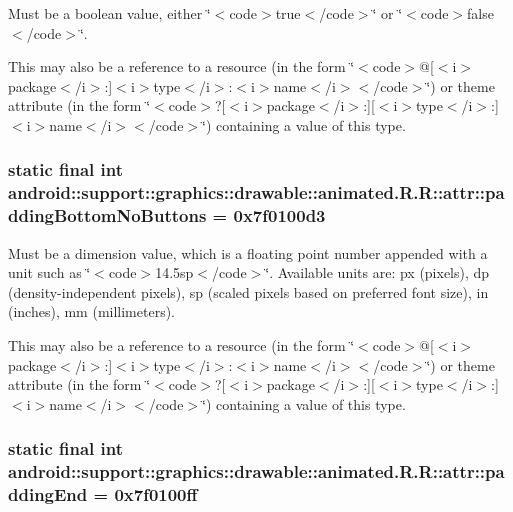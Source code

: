 Must be a boolean value, either \char`\"{}$<$code$>$true$<$/code$>$\char`\"{} or \char`\"{}$<$code$>$false$<$/code$>$\char`\"{}. 

This may also be a reference to a resource (in the form \char`\"{}$<$code$>$@\mbox{[}$<$i$>$package$<$/i$>$:\mbox{]}$<$i$>$type$<$/i$>$:$<$i$>$name$<$/i$>$$<$/code$>$\char`\"{}) or theme attribute (in the form \char`\"{}$<$code$>$?\mbox{[}$<$i$>$package$<$/i$>$:\mbox{]}\mbox{[}$<$i$>$type$<$/i$>$:\mbox{]}$<$i$>$name$<$/i$>$$<$/code$>$\char`\"{}) containing a value of this type. \hypertarget{classandroid_1_1support_1_1graphics_1_1drawable_1_1animated_1_1_r_1_1attr_d042d319f3a81977dd3126ed6f17b016}{
\subsubsection[{paddingBottomNoButtons}]{\setlength{\rightskip}{0pt plus 5cm}static final int android::support::graphics::drawable::animated.R.R::attr::paddingBottomNoButtons = 0x7f0100d3}}
\label{classandroid_1_1support_1_1graphics_1_1drawable_1_1animated_1_1_r_1_1attr_d042d319f3a81977dd3126ed6f17b016}


Must be a dimension value, which is a floating point number appended with a unit such as \char`\"{}$<$code$>$14.5sp$<$/code$>$\char`\"{}. Available units are: px (pixels), dp (density-independent pixels), sp (scaled pixels based on preferred font size), in (inches), mm (millimeters). 

This may also be a reference to a resource (in the form \char`\"{}$<$code$>$@\mbox{[}$<$i$>$package$<$/i$>$:\mbox{]}$<$i$>$type$<$/i$>$:$<$i$>$name$<$/i$>$$<$/code$>$\char`\"{}) or theme attribute (in the form \char`\"{}$<$code$>$?\mbox{[}$<$i$>$package$<$/i$>$:\mbox{]}\mbox{[}$<$i$>$type$<$/i$>$:\mbox{]}$<$i$>$name$<$/i$>$$<$/code$>$\char`\"{}) containing a value of this type. \hypertarget{classandroid_1_1support_1_1graphics_1_1drawable_1_1animated_1_1_r_1_1attr_d2504a0ff52706fb9572d228e89ffe8d}{
\subsubsection[{paddingEnd}]{\setlength{\rightskip}{0pt plus 5cm}static final int android::support::graphics::drawable::animated.R.R::attr::paddingEnd = 0x7f0100ff}}
\label{classandroid_1_1support_1_1graphics_1_1drawable_1_1animated_1_1_r_1_1attr_d2504a0ff52706fb9572d228e89ffe8d}


